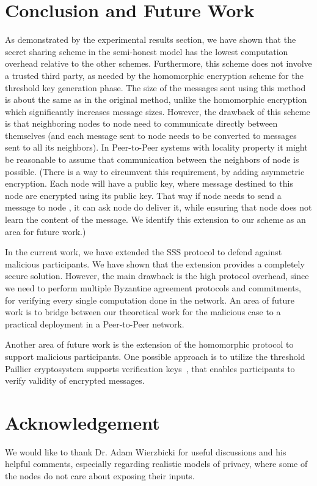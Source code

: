 \documentclass[10pt]{svjour3}
\begin{document}
\section{Conclusion and Future Work}
\label{Conclusion} As demonstrated by the experimental results
section, we have shown that the secret sharing scheme in the
semi-honest model has the lowest computation overhead relative to
the other schemes. Furthermore, this scheme does not involve a
trusted third party, as needed by the homomorphic encryption
scheme for the threshold key generation phase. The size of the
messages sent using this method is about the same as in the
original method, unlike the homomorphic encryption which
significantly increases message sizes. However, the  drawback of
this scheme is that neighboring nodes to node  need to
communicate directly between themselves (and each message sent to
node  needs to be converted to messages sent to all its
neighbors). In Peer-to-Peer systems with locality property it
might be reasonable to assume that communication between the
neighbors of node  is possible. (There is a way to circumvent
this requirement, by adding asymmetric encryption. Each node will
have a public key, where message destined to this node are
encrypted using its public key. That way if node  needs to send
a message to node , it can ask node  do deliver it, while
ensuring that node  does not learn the  content of the message.
We identify this extension to our scheme as an area for future
work.)

In the current work, we have extended the SSS protocol to defend against
malicious participants. We have shown that the extension provides a completely secure solution.
However, the main drawback is the high protocol overhead, since we need to perform multiple
Byzantine agreement protocols and commitments, for verifying every single computation done in the network.
An area of future work is to bridge between our theoretical work for the malicious case to
a practical deployment in a Peer-to-Peer network.

Another area of future work is the extension of the homomorphic
protocol to support malicious participants. One possible approach
is to utilize the threshold Paillier cryptosystem supports
verification keys~\cite{Paillier2}, that enables participants  to
verify validity of encrypted messages.

\section*{Acknowledgement}
We would like to thank Dr. Adam Wierzbicki for useful discussions and his helpful comments, especially regarding
realistic models of privacy, where some of the nodes do not care about exposing their inputs.



\end{document}

